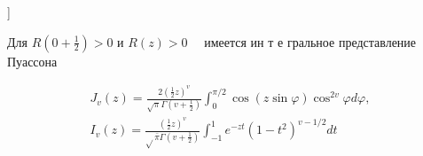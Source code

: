 \documentclass[10pt]{article}
\begin{document}
]



Для $R\left(0+\frac{1}{2}\right)>0$ и $R(z)>0 \quad$ имеется ин т е гральное представление Пуассона



\[

\begin{gathered}

J_{v}(z)=\frac{2\left(\frac{1}{2} z\right)^{v}}{\sqrt{\pi} \Gamma\left(v+\frac{1}{2}\right)} \int_{0}^{\pi / 2} \cos (z \sin \varphi) \cos ^{2 v} \varphi d \varphi, \\

I_{v}(z)=\frac{\left(\frac{1}{2} z\right)^{v}}{\sqrt{ } \bar{\pi} \Gamma\left(v+\frac{1}{2}\right)} \int_{-1}^{1} e^{-z t}\left(1-t^{2}\right)^{v-1 / 2} d t

\end{gathered}

\]
\end{document}
